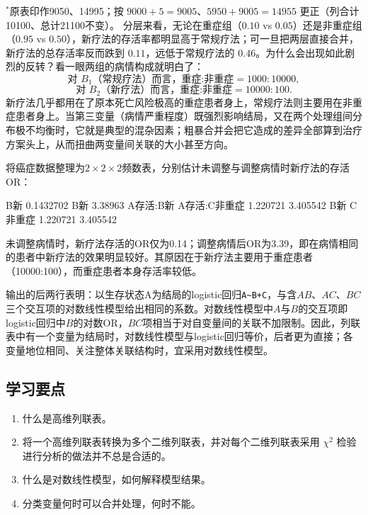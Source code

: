 {\footnotesize $^*$原表印作9050、14995；按 $9000+5=9005$、$5950+9005=14955$ 更正（列合计10100、总计21100不变）。}
分层来看，无论在重症组（$0.10$ vs $0.05$）还是非重症组（$0.95$ vs $0.50$），新疗法的存活率都明显高于常规疗法；可一旦把两层直接合并，新疗法的总存活率反而跌到 $0.11$，远低于常规疗法的 $0.46$。为什么会出现如此剧烈的反转？看一眼两组的病情构成就明白了：
\[
\text{对 }B_1\text{（常规疗法）而言，重症:非重症}=1000:10000,
\]
\[
\text{对 }B_2\text{（新疗法）而言，重症:非重症}=10000:100.
\]
新疗法几乎都用在了原本死亡风险极高的重症患者身上，常规疗法则主要用在非重症患者身上。当第三变量（病情严重程度）既强烈影响结局，又在两个处理组间分布极不均衡时，它就是典型的混杂因素；粗暴合并会把它造成的差异全部算到治疗方案头上，从而扭曲两变量间关联的大小甚至方向。
\begin{sikao}[辛普森悖论的模型分析]
将癌症数据整理为$2\times2\times2$频数表，分别估计未调整与调整病情时新疗法的存活OR：
\par\noindent
{}
\begin{routput}
      B新 
0.1432702 
    B新 
3.38963
    A存活:B新 A存活:C非重症 
     1.220721      3.405542 
     B新  C非重症 
1.220721 3.405542 
\end{routput}
未调整病情时，新疗法存活的OR仅为0.14；调整病情后OR为3.39，即在病情相同的患者中新疗法的效果明显较好。其原因在于新疗法主要用于重症患者（10000:100），而重症患者本身存活率较低。

输出的后两行表明：以生存状态A为结局的logistic回归\texttt{A\textasciitilde B+C}，与含$AB$、$AC$、$BC$三个交互项的对数线性模型给出相同的系数。对数线性模型中$A$与$B$的交互项即logistic回归中$B$的对数OR，$BC$项相当于对自变量间的关联不加限制。因此，列联表中有一个变量为结局时，对数线性模型与logistic回归等价，后者更为直接；各变量地位相同、关注整体关联结构时，宜采用对数线性模型。
\end{sikao}
\subsection{学习要点}
\begin{enumerate}
\item 什么是高维列联表。
\item 将一个高维列联表转换为多个二维列联表，并对每个二维列联表采用 $\chi^2$ 检验进行分析的做法并不总是合适的。
\item 什么是对数线性模型，如何解释模型结果。
\item 分类变量何时可以合并处理，何时不能。
\end{enumerate}
